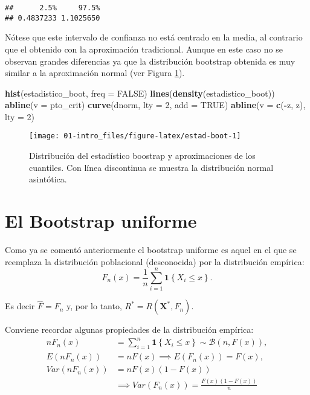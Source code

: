 \documentclass[]{book}
\newenvironment{Shaded}{\begin{snugshade}}{\end{snugshade}}
\newcommand{\KeywordTok}[1]{\textcolor[rgb]{0.13,0.29,0.53}{\textbf{#1}}}
\newcommand{\DataTypeTok}[1]{\textcolor[rgb]{0.13,0.29,0.53}{#1}}
\newcommand{\DecValTok}[1]{\textcolor[rgb]{0.00,0.00,0.81}{#1}}
\newcommand{\OtherTok}[1]{\textcolor[rgb]{0.56,0.35,0.01}{#1}}
\newcommand{\OperatorTok}[1]{\textcolor[rgb]{0.81,0.36,0.00}{\textbf{#1}}}
\newcommand{\NormalTok}[1]{#1}
\theoremstyle{break}
\theoremstyle{definition}
\theoremstyle{definition}
\theoremstyle{definition}
\theoremstyle{remark}
\begin{document}
\begin{verbatim}
##      2.5%     97.5% 
## 0.4837233 1.1025650
\end{verbatim}

Nótese que este intervalo de confianza no está centrado en la media, al
contrario que el obtenido con la aproximación tradicional. Aunque en
este caso no se observan grandes diferencias ya que la distribución
bootstrap obtenida es muy similar a la aproximación normal (ver Figura
\ref{fig:estad-boot}).

\begin{Shaded}
\begin{Highlighting}[]
\KeywordTok{hist}\NormalTok{(estadistico_boot, }\DataTypeTok{freq =} \OtherTok{FALSE}\NormalTok{)}
\KeywordTok{lines}\NormalTok{(}\KeywordTok{density}\NormalTok{(estadistico_boot))}
\KeywordTok{abline}\NormalTok{(}\DataTypeTok{v =}\NormalTok{ pto_crit)}
\KeywordTok{curve}\NormalTok{(dnorm, }\DataTypeTok{lty =} \DecValTok{2}\NormalTok{, }\DataTypeTok{add =} \OtherTok{TRUE}\NormalTok{)}
\KeywordTok{abline}\NormalTok{(}\DataTypeTok{v =} \KeywordTok{c}\NormalTok{(}\OperatorTok{-}\NormalTok{z, z), }\DataTypeTok{lty =} \DecValTok{2}\NormalTok{)}
\end{Highlighting}
\end{Shaded}

\begin{figure}[!htb]

{\centering \texttt{[image: 01-intro\_files/figure-latex/estad-boot-1]} 

}

\caption{Distribución del estadístico boostrap y aproximaciones de los cuantiles. Con línea discontinua se muestra la distribución normal asintótica.}\label{fig:estad-boot}
\end{figure}

\section{El Bootstrap uniforme}\label{intro-unif}

Como ya se comentó anteriormente el bootstrap uniforme es aquel en el
que se reemplaza la distribución poblacional (desconocida) por la
distribución empírica:
\[F_n\left( x \right) =\frac{1}{n}\sum_{i=1}^{n}\mathbf{1}\left\{ X_i\leq x\right\}.\]

Es decir \(\hat{F}=F_n\) y, por lo tanto,
\(R^{\ast}=R\left( \mathbf{X}^{\ast},F_n \right)\).

Conviene recordar algunas propiedades de la distribución empírica:
\[\begin{aligned}
nF_n\left( x \right) &= \sum_{i=1}^{n}\mathbf{1}\left\{ X_i\leq x\right\}
\sim \mathcal{B}\left( n,F\left( x \right) \right), \\
E\left( nF_n\left( x \right) \right) &= nF\left( x \right) \implies E\left(
F_n\left( x \right) \right) =F\left( x \right), \\
Var\left( nF_n\left( x \right) \right) &=  nF\left( x \right) \left(
1-F\left( x \right) \right) \\
&\implies  Var\left( F_n\left( x \right) \right) =\frac{F\left( x \right) \left( 1-F\left( x \right) \right)}{n}
\end{aligned}\]
\end{document}
